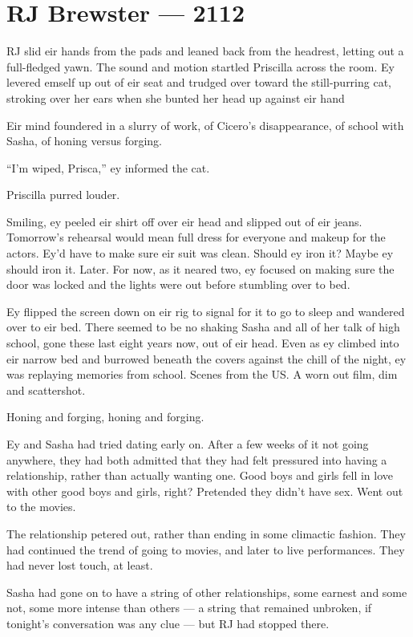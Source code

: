 \chapter*{RJ Brewster — 2112}

RJ slid eir hands from the pads and leaned back from the headrest, letting out a full-fledged yawn. The sound and motion startled Priscilla across the room. Ey levered emself up out of eir seat and trudged over toward the still-purring cat, stroking over her ears when she bunted her head up against eir hand

Eir mind foundered in a slurry of work, of Cicero's disappearance, of school with Sasha, of honing versus forging.

``I'm wiped, Prisca,'' ey informed the cat.

Priscilla purred louder.

Smiling, ey peeled eir shirt off over eir head and slipped out of eir jeans. Tomorrow's rehearsal would mean full dress for everyone and makeup for the actors. Ey'd have to make sure eir suit was clean. Should ey iron it? Maybe ey should iron it. Later. For now, as it neared two, ey focused on making sure the door was locked and the lights were out before stumbling over to bed.

Ey flipped the screen down on eir rig to signal for it to go to sleep and wandered over to eir bed. There seemed to be no shaking Sasha and all of her talk of high school, gone these last eight years now, out of eir head. Even as ey climbed into eir narrow bed and burrowed beneath the covers against the chill of the night, ey was replaying memories from school. Scenes from the US. A worn out film, dim and scattershot.

Honing and forging, honing and forging.

Ey and Sasha had tried dating early on. After a few weeks of it not going anywhere, they had both admitted that they had felt pressured into having a relationship, rather than actually wanting one. Good boys and girls fell in love with other good boys and girls, right? Pretended they didn't have sex. Went out to the movies.

The relationship petered out, rather than ending in some climactic fashion. They had continued the trend of going to movies, and later to live performances. They had never lost touch, at least.

Sasha had gone on to have a string of other relationships, some earnest and some not, some more intense than others --- a string that remained unbroken, if tonight's conversation was any clue --- but RJ had stopped there.

